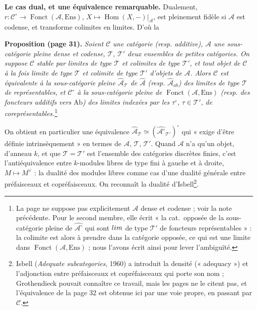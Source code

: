 \documentclass[11pt,a4paper]{article}
\begin{document}
\textbf{Le cas dual, et une équivalence remarquable.} Dualement,
$r : \mathcal{C}^{\circ} \to \operatorname{Fonct}(\mathcal{A}, \mathrm{Ens})$,
$X \mapsto \operatorname{Hom}(X, -)|_{\mathcal{A}}$, est pleinement fidèle si
$\mathcal{A}$ est codense, et transforme colimites en limites. D'où la

\textbf{Proposition (page 31).} \emph{Soient $\mathcal{C}$ une catégorie
(resp. additive), $\mathcal{A}$ une sous-catégorie pleine dense et codense,
$\mathcal{T}$, $\mathcal{T}'$ deux ensembles de petites catégories. On
suppose $\mathcal{C}$ stable par limites de type $\mathcal{T}$ et colimites
de type $\mathcal{T}'$, et tout objet de $\mathcal{C}$ à la fois limite de
type $\mathcal{T}$ et colimite de type $\mathcal{T}'$ d'objets de
$\mathcal{A}$. Alors $\mathcal{C}$ est équivalente à la sous-catégorie pleine
$\widehat{\mathcal{A}}_{\mathcal{T}}$ de $\widehat{\mathcal{A}}$ (resp.
$\widehat{\mathcal{A}}_{ab}$) des limites de type $\mathcal{T}$ de
représentables, et $\mathcal{C}^{\circ}$ à la sous-catégorie pleine de
$\operatorname{Fonct}(\mathcal{A}, \mathrm{Ens})$ (resp. des foncteurs
additifs vers $\mathrm{Ab}$) des limites indexées par les
$\tau^{\circ}$, $\tau \in \mathcal{T}'$, de coreprésentables.}\footnote{La
page ne suppose pas explicitement $\mathcal{A}$ dense et codense ; voir la
note précédente. Pour le second membre, elle écrit « la cat.\ opposée de la
sous-catégorie pleine de $\widehat{\mathcal{A}^{\circ}}$ qui sont
$\varinjlim$ de type $\mathcal{T}'$ de foncteurs représentables » : la
colimite est alors à prendre dans la catégorie opposée, ce qui est une
limite dans $\operatorname{Fonct}(\mathcal{A}, \mathrm{Ens})$ ; nous l'avons
écrit ainsi pour lever l'ambiguïté.}

On obtient en particulier une équivalence
$\widehat{\mathcal{A}}_{\mathcal{T}} \simeq
(\widehat{\mathcal{A}^{\circ}}_{\mathcal{T}'})^{\circ}$ qui « exige d'être
définie intrinsèquement » en termes de $\mathcal{A}$, $\mathcal{T}$,
$\mathcal{T}'$. Quand $\mathcal{A}$ n'a qu'un objet, d'anneau $k$, et que
$\mathcal{T} = \mathcal{T}'$ est l'ensemble des catégories discrètes finies,
c'est l'antiéquivalence entre $k$-modules libres de type fini à gauche et à
droite, $M \mapsto M^{\vee}$ : la dualité des modules libres comme cas
d'une dualité générale entre préfaisceaux et copréfaisceaux. On reconnaît la
dualité d'Isbell\footnote{Isbell (\emph{Adequate subcategories}, 1960) a
introduit la densité (« adequacy ») et l'adjonction entre préfaisceaux et
copréfaisceaux qui porte son nom ; Grothendieck pouvait connaître ce
travail, mais les pages ne le citent pas, et l'équivalence de la page 32
est obtenue ici par une voie propre, en passant par $\mathcal{C}$.}.
\end{document}
